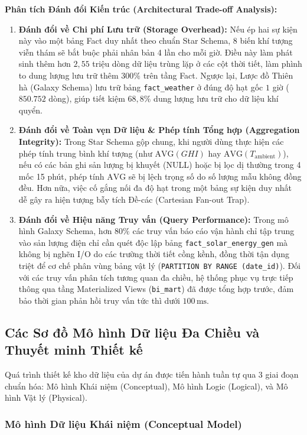\documentclass[12pt, a4paper]{report}
\begin{document}
\textbf{Phân tích Đánh đổi Kiến trúc (Architectural Trade-off Analysis):}
\begin{enumerate}[leftmargin=*]
    \item \textbf{Đánh đổi về Chi phí Lưu trữ (Storage Overhead):} Nếu ép hai sự kiện này vào một bảng Fact duy nhất theo chuẩn Star Schema, 8 biến khí tượng viễn thám sẽ bắt buộc phải nhân bản 4 lần cho mỗi giờ. Điều này làm phát sinh thêm hơn $2{,}55$ triệu dòng dữ liệu trùng lặp ở các cột thời tiết, làm phình to dung lượng lưu trữ thêm $300\%$ trên tầng Fact. Ngược lại, Lược đồ Thiên hà (Galaxy Schema) lưu trữ bảng \texttt{fact\_weather} ở đúng độ hạt gốc $1$ giờ ($850.752$ dòng), giúp tiết kiệm $68{,}8\%$ dung lượng lưu trữ cho dữ liệu khí quyển.
    \item \textbf{Đánh đổi về Toàn vẹn Dữ liệu \& Phép tính Tổng hợp (Aggregation Integrity):} Trong Star Schema gộp chung, khi người dùng thực hiện các phép tính trung bình khí tượng (như $\text{AVG}(GHI)$ hay $\text{AVG}(T_{\text{ambient}})$), nếu có các bản ghi sản lượng bị khuyết (NULL) hoặc bị lọc dị thường trong 4 mốc 15 phút, phép tính $\text{AVG}$ sẽ bị lệch trọng số do số lượng mẫu không đồng đều. Hơn nữa, việc cố gắng nối đa độ hạt trong một bảng sự kiện duy nhất dễ gây ra hiện tượng bẫy tích Đề-các (Cartesian Fan-out Trap).
    \item \textbf{Đánh đổi về Hiệu năng Truy vấn (Query Performance):} Trong mô hình Galaxy Schema, hơn $80\%$ các truy vấn báo cáo vận hành chỉ tập trung vào sản lượng điện chỉ cần quét độc lập bảng \texttt{fact\_solar\_energy\_gen} mà không bị nghẽn I/O do các trường thời tiết cồng kềnh, đồng thời tận dụng triệt để cơ chế phân vùng bảng vật lý (\texttt{PARTITION BY RANGE (date\_id)}). Đối với các truy vấn phân tích tương quan đa chiều, hệ thống phục vụ trực tiếp thông qua tầng Materialized Views (\texttt{bi\_mart}) đã được tổng hợp trước, đảm bảo thời gian phản hồi truy vấn tức thì dưới $100\,\text{ms}$.
\end{enumerate}

\subsection{Các Sơ đồ Mô hình Dữ liệu Đa Chiều và Thuyết minh Thiết kế}

Quá trình thiết kế kho dữ liệu của dự án được tiến hành tuần tự qua 3 giai đoạn chuẩn hóa: Mô hình Khái niệm (Conceptual), Mô hình Logic (Logical), và Mô hình Vật lý (Physical).

\subsubsection{Mô hình Dữ liệu Khái niệm (Conceptual Model)}
\end{document}
